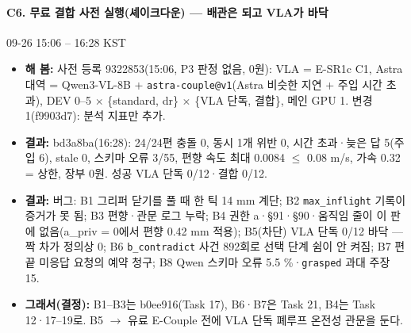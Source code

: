 \paragraph{C6. 무료 결합 사전 실행(셰이크다운) --- 배관은 되고 VLA가 바닥}
{\small 09-26 15:06 -- 16:28 KST}
\begin{itemize}
  \item \textbf{해 봄:} 사전 등록 9322853(15:06, P3 판정 없음, 0원): VLA = E-SR1c C1, Astra 대역 = Qwen3-VL-8B + \texttt{astra-\allowbreak{}couple@v1}(Astra 비슷한 지연 + 주입 시간 초과), DEV 0--5 $\times$ \{standard, dr\} $\times$ \{VLA 단독, 결합\}, 메인 GPU 1. 변경 1(f9903d7): 분석 지표만 추가.
  \item \textbf{결과:} bd3a8ba(16:28): 24/24편 충돌 0, 동시 1개 위반 0, 시간 초과·늦은 답 5(주입 6), stale 0, 스키마 오류 3/55, 편향 속도 최대 0.0084 $\leq$ 0.08 m/s, 가속 0.32 = 상한, 장부 0원. 성공 VLA 단독 0/12·결합 0/12.
  \item \textbf{결과:} 버그: B1 그리퍼 닫기를 풀 때 한 틱 14 mm 계단; B2 \texttt{max\_\allowbreak{}inflight} 기록이 증거가 못 됨; B3 편향·관문 로그 누락; B4 권한 a·§91·§90·움직임 줄이 이 판에 없음(a\_priv = 0에서 편향 0.42 mm 적용); B5(차단) VLA 단독 0/12 바닥 --- 짝 차가 정의상 0; B6 \texttt{b\_\allowbreak{}contradict} 사건 892회로 선택 단계 쉼이 안 켜짐; B7 편 끝 미응답 요청의 예약 청구; B8 Qwen 스키마 오류 5.5 \%·\texttt{grasped} 과대 주장 15.
  \item \textbf{그래서(결정):} B1--B3는 b0ee916(Task 17), B6·B7은 Task 21, B4는 Task 12·17--19로. B5 $\rightarrow$ 유료 E-Couple 전에 VLA 단독 폐루프 온전성 관문을 둔다.
\end{itemize}

